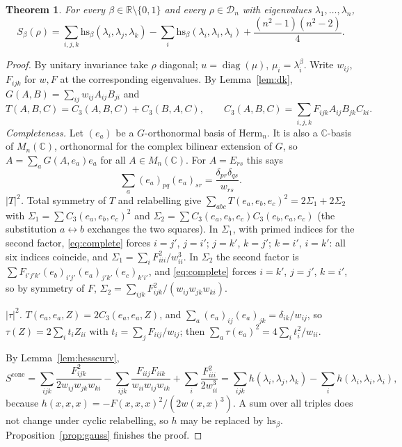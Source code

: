 \documentclass[11pt]{amsart}
\newtheorem{theorem}{Theorem}[section]
\theoremstyle{definition}
\numberwithin{equation}{section}
\newcommand{\R}{\mathbb{R}}
\newcommand{\C}{\mathbb{C}}
\newcommand{\Herm}{\mathrm{Herm}_n}
\newcommand{\Dn}{\mathcal{D}_n}
\newcommand{\hs}{\mathrm{hs}}
\begin{document}
\begin{theorem}\label{thm:closed}
For every $\beta\in\R\setminus\{0,1\}$ and every $\rho\in\Dn$ with eigenvalues $\lambda_1,\dots,\lambda_n$,
\begin{equation}\label{eq:closed}
S_\beta(\rho)=\sum_{i,j,k}\hs_\beta(\lambda_i,\lambda_j,\lambda_k)-\sum_i\hs_\beta(\lambda_i,\lambda_i,\lambda_i)+\frac{(n^2-1)(n^2-2)}4 .
\end{equation}
\end{theorem}
\begin{proof}
By unitary invariance take $\rho$ diagonal; $u=\operatorname{diag}(\mu)$, $\mu_i=\lambda_i^\beta$. Write $w_{ij}$, $F_{ijk}$ for $w,F$ at the corresponding eigenvalues. By Lemma~\ref{lem:dk},
$G(A,B)=\sum_{ij}w_{ij}A_{ij}B_{ji}$ and
\[T(A,B,C)=C_3(A,B,C)+C_3(B,A,C),\qquad C_3(A,B,C)=\sum_{i,j,k}F_{ijk}A_{ij}B_{jk}C_{ki}.\]
\emph{Completeness.} Let $(e_a)$ be a $G$-orthonormal basis of $\Herm$. It is also a $\C$-basis of $M_n(\C)$, orthonormal for the complex bilinear
extension of $G$, so $A=\sum_aG(A,e_a)e_a$ for all $A\in M_n(\C)$. For $A=E_{rs}$ this says
\begin{equation}\label{eq:complete}
\sum_a(e_a)_{pq}(e_a)_{sr}=\frac{\delta_{pr}\delta_{qs}}{w_{rs}} .
\end{equation}
\emph{$|T|^2$.} Total symmetry of $T$ and relabelling give $\sum_{abc}T(e_a,e_b,e_c)^2=2\Sigma_1+2\Sigma_2$ with $\Sigma_1=\sum C_3(e_a,e_b,e_c)^2$ and
$\Sigma_2=\sum C_3(e_a,e_b,e_c)C_3(e_b,e_a,e_c)$ (the substitution $a\leftrightarrow b$ exchanges the two squares). In $\Sigma_1$, with primed indices for the second
factor, \eqref{eq:complete} forces $i=j'$, $j=i'$; $j=k'$, $k=j'$; $k=i'$, $i=k'$: all six indices coincide, and $\Sigma_1=\sum_iF_{iii}^2/w_{ii}^3$. In $\Sigma_2$ the second factor is
$\sum F_{i'j'k'}(e_b)_{i'j'}(e_a)_{j'k'}(e_c)_{k'i'}$, and \eqref{eq:complete} forces $i=k'$, $j=j'$, $k=i'$, so by symmetry of $F$,
$\Sigma_2=\sum_{ijk}F_{ijk}^2/(w_{ij}w_{jk}w_{ki})$.

\emph{$|\tau|^2$.} $T(e_a,e_a,Z)=2C_3(e_a,e_a,Z)$, and $\sum_a(e_a)_{ij}(e_a)_{jk}=\delta_{ik}/w_{ij}$, so $\tau(Z)=2\sum_it_iZ_{ii}$ with $t_i=\sum_jF_{iij}/w_{ij}$; then
$\sum_a\tau(e_a)^2=4\sum_it_i^2/w_{ii}$.

By Lemma~\ref{lem:hesscurv},
\[S^{\mathrm{cone}}=\sum_{ijk}\frac{F_{ijk}^2}{2w_{ij}w_{jk}w_{ki}}-\sum_{ijk}\frac{F_{iij}F_{iik}}{w_{ii}w_{ij}w_{ik}}+\sum_i\frac{F_{iii}^2}{2w_{ii}^3}
=\sum_{ijk}h(\lambda_i,\lambda_j,\lambda_k)-\sum_ih(\lambda_i,\lambda_i,\lambda_i),\]
because $h(x,x,x)=-F(x,x,x)^2/(2w(x,x)^3)$. A sum over all triples does not change under cyclic relabelling, so $h$ may be replaced by $\hs_\beta$.
Proposition~\ref{prop:gauss} finishes the proof.
\end{proof}
\end{document}
